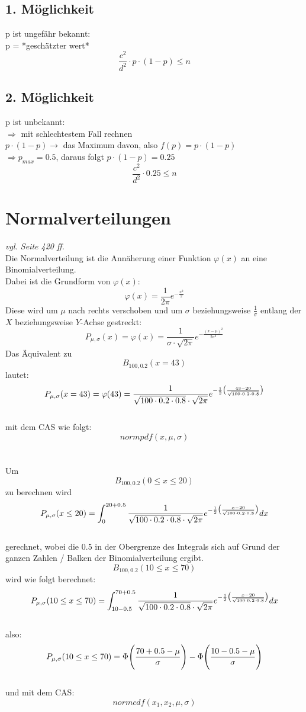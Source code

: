 \documentclass[a4paper,12pt]{article}
\begin{document}
\subsection{1. Möglichkeit}
p ist ungefähr bekannt:\\
p = *geschätzter wert*\\
$$\frac{c^{2}}{d^{2}} \cdot p \cdot(1 - p) \leq n$$
\subsection{2. Möglichkeit}
p ist unbekannt:\\
$\Rightarrow$ mit schlechtestem Fall rechnen\\
$p \cdot (1 - p) \rightarrow$ das Maximum davon, also $f(p) = p \cdot (1 - p)$\\
$\Rightarrow p_{max} = 0.5$, daraus folgt $p \cdot (1 - p) = 0.25$\\
$$\frac{c^{2}}{d^{2}} \cdot 0.25 \leq n$$ 
\section{Normalverteilungen}
\textit{vgl. Seite 420 ff.}\\
Die Normalverteilung ist die Annäherung einer Funktion $\varphi(x)$ an eine Binomialverteilung.\\
Dabei ist die Grundform von $\varphi(x)$:
$$\varphi(x) = \frac{1}{2 \pi} e^{- \frac{x^2}{2}}$$
Diese wird um $\mu$ nach rechts verschoben und um $\sigma$ beziehungsweise $\frac{1}{\sigma}$ entlang der $X$ beziehungsweise $Y$-Achse gestreckt:
$$P_{\mu, \sigma}(x) = \varphi(x) = \frac{1}{\sigma \cdot  \sqrt{2 \pi}} e^{-\frac{(x - \mu)^{2}}{2 \sigma^{2}}}$$
Das Äquivalent zu
$$B_{100, 0.2}(x = 43)$$
lautet:\\
$$P_{\mu, \sigma}(x = 43) = \varphi(43) = \frac{1}{\sqrt{100 \cdot 0.2 \cdot 0.8} \cdot  \sqrt{2 \pi}} e^{-\frac{1}{2} \big{(}\frac{43 - 20}{\sqrt{100 \cdot 0.2 \cdot 0.8}}\big{)}}$$
\\mit dem CAS wie folgt:
$$normpdf(x, \mu, \sigma)$$
\\
\pagebreak
\\Um
$$B_{100, 0.2}(0 \leq x \leq 20)$$
zu berechnen wird\\
$$P_{\mu, \sigma}(x \leq 20) = \int_{0}^{20 + 0.5} \frac{1}{\sqrt{100 \cdot 0.2 \cdot 0.8} \cdot  \sqrt{2 \pi}} e^{-\frac{1}{2} \big{(}\frac{x - 20}{\sqrt{100 \cdot 0.2 \cdot 0.8}}\big{)}} dx$$
\\gerechnet, wobei die 0.5 in der Obergrenze des Integrals sich auf Grund der ganzen Zahlen / Balken der Binomialverteilung ergibt.\\
$$B_{100, 0.2}(10 \leq x \leq 70)$$
wird wie folgt berechnet:\\
$$P_{\mu, \sigma}(10 \leq x \leq 70) = \int_{10 - 0.5}^{70 + 0.5} \frac{1}{\sqrt{100 \cdot 0.2 \cdot 0.8} \cdot  \sqrt{2 \pi}} e^{-\frac{1}{2} \big{(}\frac{x - 20}{\sqrt{100 \cdot 0.2 \cdot 0.8}}\big{)}} dx$$
\\also:\\
$$P_{\mu, \sigma}(10 \leq x \leq 70) = \Phi\Bigg{(}\frac{70 + 0.5 - \mu}{\sigma}\Bigg{)} - \Phi\Bigg{(}\frac{10 - 0.5 - \mu}{\sigma}\Bigg{)}$$
\\und mit dem CAS:
$$normcdf(x_1, x_2, \mu, \sigma)$$
\pagebreak
\end{document}
